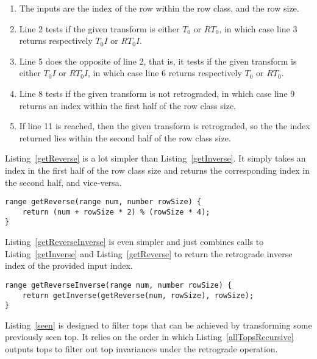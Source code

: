 \begin{enumerate}
\item The inputs are the index of the row within the row class, and the row size.
\item Line 2 tests if the given transform is either $T_0$ or $RT_0$, in which case line 3 returns respectively $T_0I$ or $RT_0I$.
\addtocounter{enumi}{2}
\item Line 5 does the opposite of line 2, that is, it tests if the given transform is either $T_0I$ or $RT_0I$, in which case line 6 returns respectively $T_0$ or $RT_0$.
\addtocounter{enumi}{2}
\item Line 8 tests if the given transform is not retrograded, in which case line 9 returns an index within the first half of the row class size.
\addtocounter{enumi}{2}
\item If line 11 is reached, then the given transform is retrograded, so the the index returned lies within the second half of the row class size.
\end{enumerate}

Listing~\ref{getReverse} is a lot simpler than Listing~\ref{getInverse}. It simply takes an index in the first half of the row class size and returns the corresponding index in the second half, and vice-versa.

\begin{lstlisting}[caption={Computing the index of the retrograde row within a row class.},label={getReverse}]
range getReverse(range num, number rowSize) {
    return (num + rowSize * 2) % (rowSize * 4);
}
\end{lstlisting}

Listing~\ref{getReverseInverse} is even simpler and just combines calls to Listing~\ref{getInverse} and Listing~\ref{getReverse} to return the retrograde inverse index of the provided input index.

\begin{lstlisting}[caption={Computing the index of the retrograde inverse row within a row class.},label={getReverseInverse}]
range getReverseInverse(range num, number rowSize) {
    return getInverse(getReverse(num, rowSize), rowSize);
}
\end{lstlisting}

Listing~\ref{seen} is designed to filter tops that can be achieved by transforming some previously seen top. It relies on the order in which Listing~\ref{allTopsRecursive} outputs tops to filter out top invariances under the retrograde operation.

